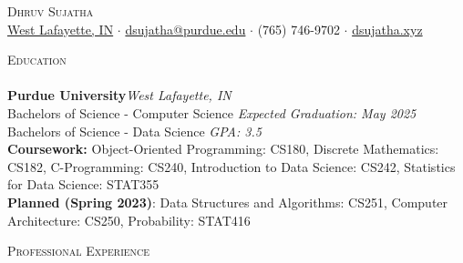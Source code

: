 \documentclass[a4paper]{article}
\newcommand{\lineunder} {
    \vspace*{-8pt} \\
    \hspace*{-18pt} \hrulefill \\
}
\newcommand{\header} [1] {
    {\hspace*{-18pt}\vspace*{6pt} \textsc{#1}}
    \vspace*{-6pt} \lineunder
}
\begin{document}
\vspace*{-40pt}

    

\vspace*{-10pt}
\begin{center}
	{\Huge \scshape {Dhruv Sujatha}}\\
	\href{https://www.google.com/maps/place/West+Lafayette,+IN/}{West Lafayette, IN} $\cdot$ \href{mailto:dsujatha@purdue.edu}{dsujatha@purdue.edu} $\cdot$ (765) 746-9702 $\cdot$ \href{https://dsujatha.xyz}{dsujatha.xyz}\\
\end{center}

\header{Education}
\textbf{Purdue University}\hfill \textit {West Lafayette, IN}\\
Bachelor\textquotesingle{}s of Science - Computer Science \hfill \textit {Expected Graduation: May 2025}\\
Bachelor\textquotesingle{}s of Science - Data Science \hfill \textit{GPA: 3.5}\\
\vspace{5pt}
\textbf{Coursework:} Object-Oriented Programming: CS180, Discrete Mathematics: CS182, C-Programming: CS240, Introduction to Data Science: CS242, Statistics for Data Science: STAT355\\
\textbf{Planned (Spring 2023)}: Data Structures and Algorithms: CS251, Computer Architecture: CS250, Probability: STAT416
\vspace{2mm}

\header{Professional Experience}
\vspace{1mm}
\end{document}
